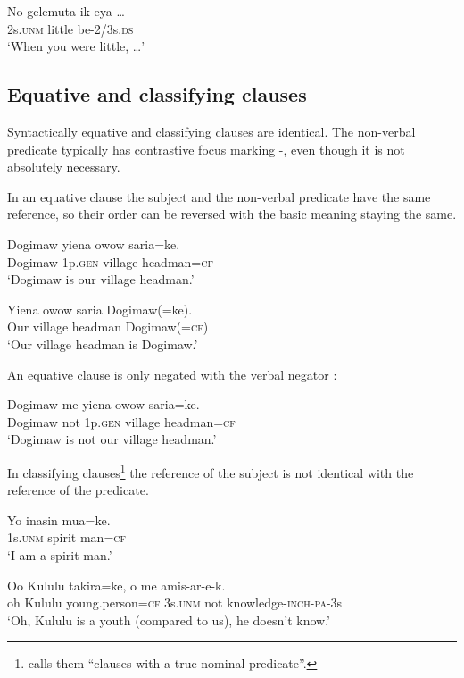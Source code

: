 \ea%
\label{ex:x987}
\gll No  gelemuta  ik-eya  {\dots} \\
     2s.\textsc{unm}  little  be-2/3s.\textsc{ds} \\
\glt `When you were little, {\dots}'
\z

\subsection{Equative and classifying clauses}
{}
Syntactically equative and classifying clauses are identical. The non-verbal predicate typically has contrastive focus marking -, even though it is not absolutely necessary. 

In an equative clause the subject and the non-verbal predicate have the same reference, so their order can be reversed with the basic meaning staying the same. 

\ea%
\label{ex:x975}
\gll Dogimaw  yiena  owow  saria=ke. \\
     Dogimaw  1p.\textsc{gen}  village  headman=\textsc{cf} \\
\glt `Dogimaw is our village headman.'
\z

\ea%
\label{ex:x976}
\gll Yiena  owow  saria  Dogimaw(=ke). \\
     Our  village  headman  Dogimaw(=\textsc{cf}) \\
\glt `Our village headman is Dogimaw.'
\z

An equative clause is only negated with the verbal negator :

\ea%
\label{ex:x1752}
\gll Dogimaw  me  yiena  owow  saria=ke. \\
     Dogimaw  not  1p.\textsc{gen}  village  headman=\textsc{cf} \\
\glt `Dogimaw is not our village headman.'
\z

In classifying clauses\footnote{\citet[233]{Dryer2007b} calls them ``clauses with a true nominal predicate''.} the reference of the subject is not identical with the reference of the predicate.

\ea%
\label{ex:x977}
\gll Yo  inasin  mua=ke. \\
     1s.\textsc{unm}  spirit  man=\textsc{cf} \\
\glt `I am a spirit man.'
\z

\ea%
\label{ex:x978}
\gll Oo  Kululu  takira=ke,  o  me  amis-ar-e-k. \\
     oh  Kululu  young.person=\textsc{cf}  3s.\textsc{unm}  not  knowledge-\textsc{inch}-\textsc{pa}-3s \\
\glt `Oh, Kululu is a youth (compared to us), he doesn't know.'
\z

